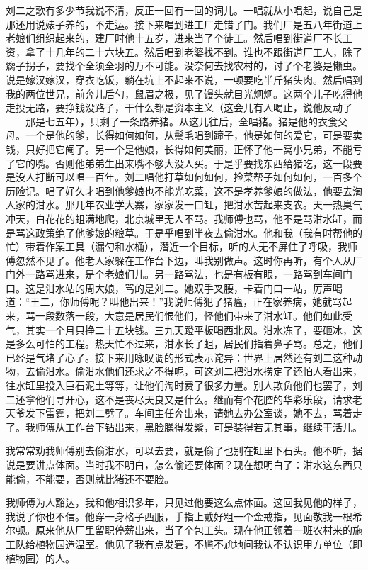  刘二之歌有多少节我说不清，反正一回有一回的词儿。一唱就从小唱起，说自己是那还用说婊子养的，不走运。接下来唱到进工厂走错了门。我们厂是五八年街道上老娘们组织起来的，建厂时他十五岁，进来当了个徒工。然后唱到街道厂不长工资，拿了十几年的二十六块五。然后唱到老婆找不到。谁也不跟街道厂工人，除了瘸子拐子，要找个全须全羽的万不可能。没奈何去找农村的，讨了个老婆是懒虫。说是嫁汉嫁汉，穿衣吃饭，躺在坑上不起来不说，一顿要吃半斤猪头肉。然后唱到我的两位世兄，前奔儿后勺，鼠眉之极，见了馒头就目光炯炯。这两个儿子吃得他走投无路，要挣钱没路子，干什么都是资本主义（这会儿有人喝止，说他反动了——那是七五年），只剩了一条路养猪。从这儿往后，全唱猪。猪是他的衣食父母。一个是他的爹，长得如何如何，从鬃毛唱到蹄子，他是如何的爱它，可是要卖钱，只好把它阉了。另一个是他娘，长得如何美丽，正怀了他一窝小兄弟，不能亏了它的嘴。否则他弟弟生出来嘴不够大没人买。于是乎要找东西给猪吃，这一段要是没人打断可以唱一百年。刘二唱他打草如何如何，捡菜帮子如何如何，一百多个历险记。唱了好久才唱到他爹娘也不能光吃菜，这不是孝养爹娘的做法，他要去淘人家的泔水。那几年农业学大寨，家家发一口缸，把泔水苦起来支农。天一热臭气冲天，白花花的蛆满地爬，北京城里无人不骂。我师傅也骂，他不是骂泔水缸，而是骂这政策绝了他爹娘的粮草。于是乎唱到半夜去偷泔水。他和我（我有时帮他的忙）带着作案工具（漏勺和水桶），潜近一个目标，听的人无不屏住了呼吸，我师傅忽然不见了。他老人家躲在工作台下边，叫我别做声。这时你再听，有个人从厂门外一路骂进来，是个老娘们儿。另一路骂法，也是有板有眼，一路骂到车间门口。这是泔水站的周大娘，骂的是刘二。她双手叉腰，卡着门口一站，厉声喝道：“王二，你师傅呢？叫他出来！”我说师傅犯了猪瘟，正在家养病，她就骂起来，骂一段数落一段，大意是居民们恨他们，怪他们带来了泔水缸。他们如此受气，其实一个月只挣二十五块钱。三九天蹬平板喝西北风。泔水冻了，要砸冰，这是多么可怕的工程。热天忙不过来，泔水长了蛆，居民们指着鼻子骂。总之，他们已经是气堵了心了。接下来用咏叹调的形式表示诧异：世界上居然还有刘二这种动物，去偷泔水。偷泔水他们还求之不得呢，可这刘二把泔水捞定了还怕人看出来，往水缸里投入巨石泥土等等，让他们淘时费了很多力量。别人欺负他们也罢了，刘二还拿他们寻开心，这不是丧尽天良又是什么。继而有个花腔的华彩乐段，请求老天爷发下雷霆，把刘二劈了。车间主任奔出来，请她去办公室谈，她不去，骂着走了。我师傅从工作台下钻出来，黑脸臊得发紫，可是装得若无其事，继续干活儿。 
 
 我常常劝我师傅别去偷泔水，可以去要，就是偷了也别在缸里下石头。他不听，据说是要讲点体面。当时我不明白，怎么偷还要体面？现在想明白了：泔水这东西只能偷，不能要，否则就比猪还不要脸。 
 
 我师傅为人豁达，我和他相识多年，只见过他要这么点体面。这回我见他的样子，我说了你也不信。他穿一身格子西服，手指上戴好粗一个金戒指，见面敬我一根希尔顿。原来他从厂里留职停薪出来，当了个包工头。现在他正领着一班农村来的施工队给植物园造温室。他见了我有点发窘，不尴不尬地问我认不认识甲方单位（即植物园）的人。 
 
